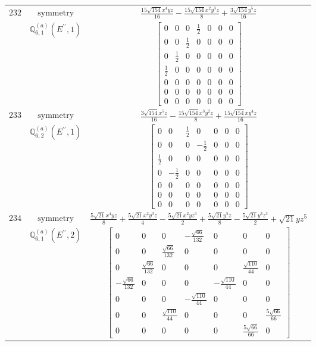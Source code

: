 \documentclass[fleqn,8pt,landscape]{jsarticle}
\begin{document}
\begin{longtable}{ccc}
$ 232 $ & $ \text{symmetry} $ & $ \frac{15 \sqrt{154} x^{4} y z}{16} - \frac{15 \sqrt{154} x^{2} y^{3} z}{8} + \frac{3 \sqrt{154} y^{5} z}{16} $ \\
$  $ & $ \mathbb{Q}_{6,1}^{(a)}(E^{\prime\prime},1) $ & $ \begin{bmatrix} 0 & 0 & 0 & \frac{1}{2} & 0 & 0 & 0 \\ 0 & 0 & \frac{1}{2} & 0 & 0 & 0 & 0 \\ 0 & \frac{1}{2} & 0 & 0 & 0 & 0 & 0 \\ \frac{1}{2} & 0 & 0 & 0 & 0 & 0 & 0 \\ 0 & 0 & 0 & 0 & 0 & 0 & 0 \\ 0 & 0 & 0 & 0 & 0 & 0 & 0 \\ 0 & 0 & 0 & 0 & 0 & 0 & 0 \end{bmatrix} $ \\ \hline
$ 233 $ & $ \text{symmetry} $ & $ \frac{3 \sqrt{154} x^{5} z}{16} - \frac{15 \sqrt{154} x^{3} y^{2} z}{8} + \frac{15 \sqrt{154} x y^{4} z}{16} $ \\
$  $ & $ \mathbb{Q}_{6,2}^{(a)}(E^{\prime\prime},1) $ & $ \begin{bmatrix} 0 & 0 & \frac{1}{2} & 0 & 0 & 0 & 0 \\ 0 & 0 & 0 & - \frac{1}{2} & 0 & 0 & 0 \\ \frac{1}{2} & 0 & 0 & 0 & 0 & 0 & 0 \\ 0 & - \frac{1}{2} & 0 & 0 & 0 & 0 & 0 \\ 0 & 0 & 0 & 0 & 0 & 0 & 0 \\ 0 & 0 & 0 & 0 & 0 & 0 & 0 \\ 0 & 0 & 0 & 0 & 0 & 0 & 0 \end{bmatrix} $ \\ \hline
$ 234 $ & $ \text{symmetry} $ & $ \frac{5 \sqrt{21} x^{4} y z}{8} + \frac{5 \sqrt{21} x^{2} y^{3} z}{4} - \frac{5 \sqrt{21} x^{2} y z^{3}}{2} + \frac{5 \sqrt{21} y^{5} z}{8} - \frac{5 \sqrt{21} y^{3} z^{3}}{2} + \sqrt{21} y z^{5} $ \\
$  $ & $ \mathbb{Q}_{6,1}^{(a)}(E^{\prime\prime},2) $ & $ \begin{bmatrix} 0 & 0 & 0 & - \frac{\sqrt{66}}{132} & 0 & 0 & 0 \\ 0 & 0 & \frac{\sqrt{66}}{132} & 0 & 0 & 0 & 0 \\ 0 & \frac{\sqrt{66}}{132} & 0 & 0 & 0 & \frac{\sqrt{110}}{44} & 0 \\ - \frac{\sqrt{66}}{132} & 0 & 0 & 0 & - \frac{\sqrt{110}}{44} & 0 & 0 \\ 0 & 0 & 0 & - \frac{\sqrt{110}}{44} & 0 & 0 & 0 \\ 0 & 0 & \frac{\sqrt{110}}{44} & 0 & 0 & 0 & \frac{5 \sqrt{66}}{66} \\ 0 & 0 & 0 & 0 & 0 & \frac{5 \sqrt{66}}{66} & 0 \end{bmatrix} $ \\ \hline

\end{longtable}
\end{document}
